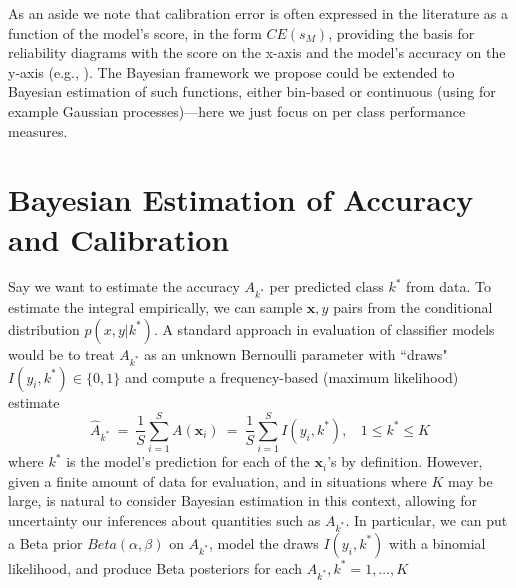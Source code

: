 \documentclass{article}
\newcommand{\ux}{{\mathbf{x}}}
\begin{document}
As an aside we note that calibration error is often expressed in the literature as a function of the model's score, in the form $CE(s_M)$, providing the basis for reliability diagrams with the score on the x-axis and the model's accuracy on the y-axis (e.g., \cite{guo2017calibration}).
The Bayesian framework we propose could be extended to Bayesian estimation of such functions, either bin-based or continuous (using for example Gaussian processes)---here we just focus on per class performance measures.


\section{Bayesian Estimation of Accuracy and Calibration}
Say we want to estimate the accuracy ${A}_{k^*}$ per predicted class $k^*$ from data. To estimate the integral empirically, we can sample $\ux,y$ pairs from the conditional distribution $p(x,y | k^*)$.
A standard approach in evaluation of classifier models would be to treat ${A}_{k^*}$ as an unknown Bernoulli parameter with ``draws" $I(y_i, k^*) \in \{0,1\}$ and compute a frequency-based (maximum likelihood) estimate
\[
\hat{A}_{k^*} \ = \  \frac{1}{S} \sum_{i=1}^S A(\ux_i) 
 \ = \ \frac{1}{S} \sum_{i=1}^S I(y_i, k^*), \ \ \ \ 1 \le k^* \le K   
\]
where $k^*$ is the model's prediction for each of the $\ux_i$'s by definition.
However, given a finite amount of data for evaluation, and in situations where $K$ may be large, is natural to consider Bayesian estimation in this context, allowing for  uncertainty our inferences about quantities such as ${A}_{k^*}$.
In particular, we can put a Beta prior $Beta(\alpha, \beta)$ on ${A}_{k^*}$, model the draws $I(y_i, k^*)$ with a binomial likelihood, and produce Beta posteriors for each ${A}_{k^*}, k^* = 1,\ldots,K$
 
\end{document}
